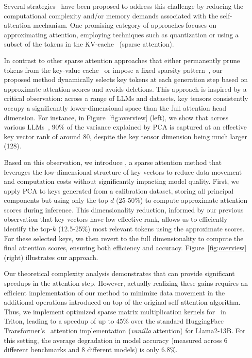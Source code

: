 Several strategies~\citep{zhang2023hH2O, ribar2023sparq, liu2023scissorhands}
have been proposed to address this challenge by reducing the computational
complexity and/or memory demands associated with the self-attention mechanism.
One promising category of approaches focuses on approximating attention,
employing techniques such as quantization or using a subset of the tokens in
the KV-cache~\citep{ge2024model} (sparse attention).

In contrast to other sparse attention approaches that either permanently prune
tokens from the key-value cache~\citep{zhang2023hH2O} or impose a fixed
sparsity pattern~\citep{xiao2023efficient}, our proposed method dynamically
selects key tokens at each generation step based on approximate attention
scores and avoids deletions.  This approach is inspired by a critical
observation: across a range of LLMs and datasets, key tensors consistently
occupy a significantly lower-dimensional space than the full attention head
dimension. For instance, in Figure~\ref{fig:overview} (left), we show that
across various LLMs~\citep{dubey2024llama3herdmodels, jiang2024mixtral}, 90\%
of the variance explained by PCA is captured at an effective key vector rank of
around 80, despite the key tensor dimension being much larger (128).

Based on this observation, we introduce \method, a sparse attention method that
leverages the low-dimensional structure of key vectors to reduce data movement
and computation costs without significantly impacting model quality. First, we
apply PCA to keys generated from a calibration dataset, storing all principal
components but using only the top $d$ (25-50\%) to compute approximate
attention scores during inference. This dimensionality reduction, informed by
our previous observation that key vectors have low effective rank, allows us to
efficiently identify the top-$k$ (12.5-25\%) most relevant tokens using the
approximate scores. For these selected keys, we then revert to the full
dimensionality to compute the final attention scores, ensuring both efficiency
and accuracy. Figure~\ref{fig:overview} (right) illustrates our approach.

Our theoretical complexity analysis demonstrates that \method can provide
significant speedups in the attention step. However, actually realizing these
gains requires an efficient implementation of our method to minimize data
movement in the additional operations introduced on top of the original self
attention algorithm. Thus, we implement optimized sparse matrix multiplication kernels
for \method~in Triton, leading to a speedup of up to 45\% over the 
standard HuggingFace Transformer's~\citep{wolf-etal-2020-transformers} attention 
implementation (\emph{vanilla} attention) for Llama2-13B.
For this setting, the average degradation in model
accuracy (measured across 6 different benchmarks and 8 different models) is
only 6.8\%.

